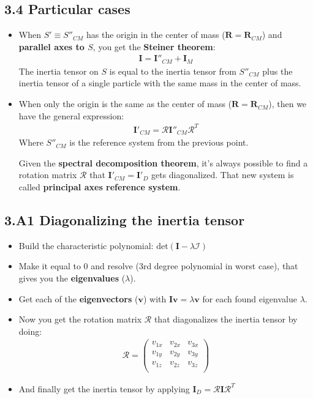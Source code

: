 \documentclass[a4paper,landscape,10pt]{cheatsheet}
\begin{document}
\subsection*{3.4 Particular cases}
\begin{itemize}
  \item When $S'\equiv S''_{CM}$ has the origin in the center of mass ($\textbf{R}=\textbf{R}_{CM}$) and
  \textbf{parallel axes to $S$}, you get the \textbf{Steiner theorem}:
  \begin{gather*}
    \textbf{I}=\textbf{I}''_{CM}+\textbf{I}_{M}
  \end{gather*}
  The inertia tensor on $S$ is equal to the inertia tensor from $S''_{CM}$ plus the inertia tensor of a single particle
  with the same mass in the center of mass.

  \item When only the origin is the same as the center of mass ($\textbf{R}=\textbf{R}_{CM}$), then we have the general
  expression:
  \begin{gather*}
    \textbf{I}'_{CM} = \mathcal{R}\textbf{I}''_{CM}\mathcal{R}^T
  \end{gather*}
  Where $S''_{CM}$ is the reference system from the previous point.

  Given the \textbf{spectral decomposition theorem}, it's always possible to find a rotation matrix $\mathcal{R}$ that $\textbf{I}'_{CM} = \textbf{I}'_D$ gets
  diagonalized. That new system is called \textbf{principal axes reference system}.
\end{itemize}

\subsection*{3.A1 Diagonalizing the inertia tensor}
\begin{itemize}
  \item Build the characteristic polynomial: $\text{det}(\textbf{I} - \lambda\mathcal{I})$
  \item Make it equal to 0 and resolve (3rd degree polynomial in worst case), that gives you the \textbf{eigenvalues}
  ($\lambda$).
  \item Get each of the \textbf{eigenvectors} ($\textbf{v}$) with $\textbf{I}\textbf{v} = \lambda\textbf{v}$ for each
  found eigenvalue $\lambda$.
  \item Now you get the rotation matrix $\mathcal{R}$ that diagonalizes the inertia tensor by doing:
  \begin{gather*}
    \mathcal{R} = \begin{pmatrix*}
      v_{1x} & v_{2x} & v_{3x} \\
      v_{1y} & v_{2y} & v_{3y} \\
      v_{1z} & v_{2z} & v_{3z} \\
    \end{pmatrix*}
  \end{gather*}
  \item And finally get the inertia tensor by applying $\textbf{I}_D = \mathcal{R}\textbf{I}\mathcal{R}^T$
\end{itemize}
\end{document}
